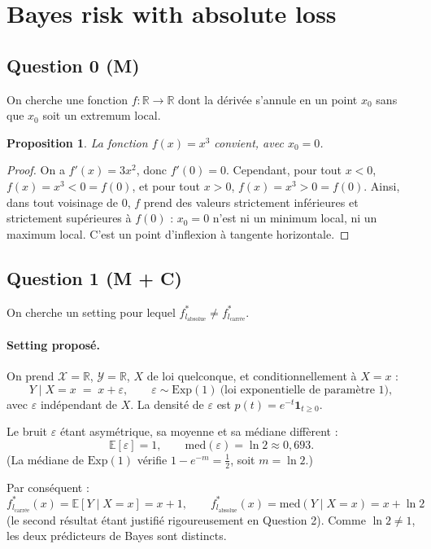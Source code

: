 \documentclass[11pt]{article}
\newtheorem{proposition}{Proposition}
\theoremstyle{remark}
\newcommand{\X}{\mathcal{X}}
\newcommand{\Y}{\mathcal{Y}}
\newcommand{\E}{\mathbb{E}}
\newcommand{\R}{\mathbb{R}}
\begin{document}
	\section{Bayes risk with absolute loss}
	
	\subsection*{Question 0 (M)}
	
	On cherche une fonction $f : \R \to \R$ dont la dérivée s'annule en un point $x_0$ sans que $x_0$ soit un extremum local.
	
	\begin{proposition}
		La fonction $f(x) = x^3$ convient, avec $x_0 = 0$.
	\end{proposition}
	
	\begin{proof}
		On a $f'(x) = 3x^2$, donc $f'(0) = 0$. Cependant, pour tout $x < 0$, $f(x) = x^3 < 0 = f(0)$, et pour tout $x > 0$, $f(x) = x^3 > 0 = f(0)$. Ainsi, dans tout voisinage de $0$, $f$ prend des valeurs strictement inférieures et strictement supérieures à $f(0)$ : $x_0=0$ n'est ni un minimum local, ni un maximum local. C'est un point d'inflexion à tangente horizontale.
	\end{proof}
	
	
	\subsection*{Question 1 (M + C)}
	
	On cherche un setting pour lequel $f^*_{l_{\text{absolue}}} \neq f^*_{l_{\text{carrée}}}$.
	
	\paragraph{Setting proposé.}
	On prend $\X = \R$, $\Y = \R$, $X$ de loi quelconque, et conditionnellement à $X = x$ :
	\[
	Y \mid X = x \;=\; x + \varepsilon, \qquad \varepsilon \sim \mathrm{Exp}(1) \ \text{(loi exponentielle de paramètre 1)},
	\]
	avec $\varepsilon$ indépendant de $X$. La densité de $\varepsilon$ est $p(t) = e^{-t}\mathbf{1}_{t \geq 0}$.
	
	Le bruit $\varepsilon$ étant asymétrique, sa moyenne et sa médiane diffèrent :
	\[
	\E[\varepsilon] = 1, \qquad \mathrm{med}(\varepsilon) = \ln 2 \approx 0{,}693.
	\]
	(La médiane de $\mathrm{Exp}(1)$ vérifie $1-e^{-m}=\tfrac12$, soit $m = \ln 2$.)
	
	Par conséquent :
	\[
	f^*_{l_{\text{carrée}}}(x) = \E[Y\mid X=x] = x + 1, \qquad
	f^*_{l_{\text{absolue}}}(x) = \mathrm{med}(Y \mid X=x) = x + \ln 2
	\]
	(le second résultat étant justifié rigoureusement en Question 2). Comme $\ln 2 \neq 1$, les deux prédicteurs de Bayes sont distincts.
	
\end{document}
